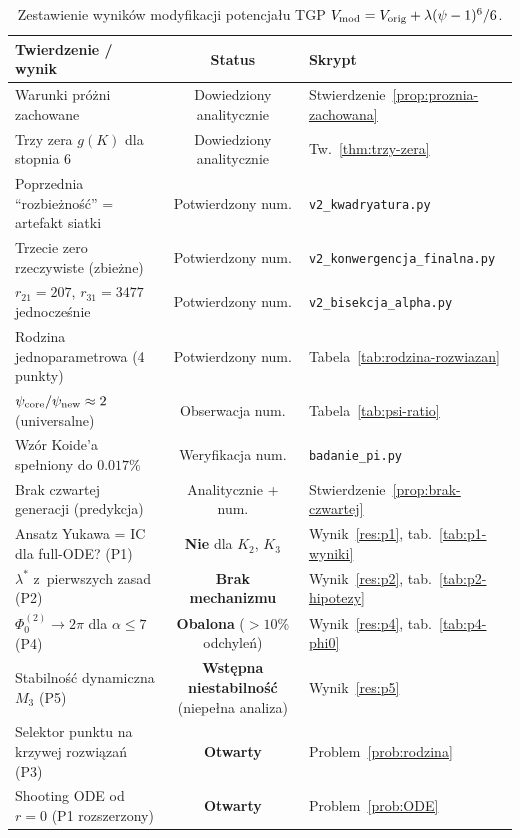 \begin{table}[h]
\centering
\small
\caption{Zestawienie wyników modyfikacji potencjału TGP
  $V_{\rm mod} = V_{\rm orig} + \lambda(\psi-1)^6/6$.}
\label{tab:podsumowanie-v2}
\begin{tabular}{@{}p{6.5cm}c p{4.5cm}@{}}
\toprule
\textbf{Twierdzenie / wynik} & \textbf{Status} & \textbf{Skrypt} \\
\midrule
Warunki próżni zachowane & Dowiedziony analitycznie
    & Stwierdzenie~\ref{prop:proznia-zachowana} \\
Trzy zera $g(K)$ dla stopnia 6 & Dowiedziony analitycznie
    & Tw.~\ref{thm:trzy-zera} \\
Poprzednia ``rozbieżność'' = artefakt siatki
    & Potwierdzony num.
    & \texttt{v2\_kwadryatura.py} \\
Trzecie zero rzeczywiste (zbieżne)
    & Potwierdzony num.
    & \texttt{v2\_konwergencja\_finalna.py} \\
$r_{21} = 207$, $r_{31} = 3477$ jednocześnie
    & Potwierdzony num.
    & \texttt{v2\_bisekcja\_alpha.py} \\
Rodzina jednoparametrowa (4 punkty)
    & Potwierdzony num.
    & Tabela~\ref{tab:rodzina-rozwiazan} \\
$\psi_{\rm core}/\psi_{\rm new} \approx 2$ (universalne)
    & Obserwacja num.
    & Tabela~\ref{tab:psi-ratio} \\
Wzór Koide'a spełniony do $0.017\%$
    & Weryfikacja num.
    & \texttt{badanie\_pi.py} \\
Brak czwartej generacji (predykcja)
    & Analitycznie + num.
    & Stwierdzenie~\ref{prop:brak-czwartej} \\
\midrule
Ansatz Yukawa = IC dla full-ODE? (P1)
    & \textbf{Nie} dla $K_2$, $K_3$
    & Wynik~\ref{res:p1}, tab.~\ref{tab:p1-wyniki} \\
$\lambda^*$ z~pierwszych zasad (P2)
    & \textbf{Brak mechanizmu}
    & Wynik~\ref{res:p2}, tab.~\ref{tab:p2-hipotezy} \\
$\Phi_0^{(2)} \to 2\pi$ dla $\alpha \leq 7$ (P4)
    & \textbf{Obalona} ($>10\%$ odchyleń)
    & Wynik~\ref{res:p4}, tab.~\ref{tab:p4-phi0} \\
Stabilność dynamiczna $M_3$ (P5)
    & \textbf{Wstępna niestabilność} (niepełna analiza)
    & Wynik~\ref{res:p5} \\
Selektor punktu na krzywej rozwiązań (P3)
    & \textbf{Otwarty}
    & Problem~\ref{prob:rodzina} \\
Shooting ODE od $r=0$ (P1 rozszerzony)
    & \textbf{Otwarty}
    & Problem~\ref{prob:ODE} \\
\bottomrule
\end{tabular}
\end{table}
